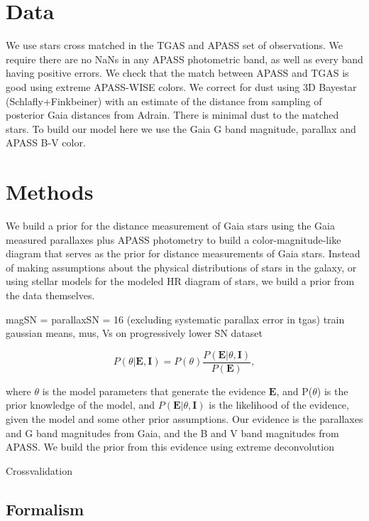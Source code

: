 \documentclass[iop]{emulateapj}
\begin{document}
\section{Data}

We use stars cross matched in the TGAS and APASS set of observations. We require there are no NaNs in any APASS photometric band, as well as every band having positive errors. We check that the match between APASS and TGAS is good using extreme APASS-WISE colors. We correct for dust using 3D Bayestar (Schlafly+Finkbeiner) with an estimate of the distance from sampling of posterior Gaia distances from Adrain. There is minimal dust to the matched stars. To build our model here we use the Gaia G band magnitude, parallax and APASS B-V color. 

\section{Methods}

We build a prior for the distance measurement of Gaia stars using the Gaia measured parallaxes plus APASS photometry to build a color-magnitude-like diagram that serves as the prior for distance measurements of Gaia stars. Instead of making assumptions about the physical distributions of stars in the galaxy, or using stellar models for the modeled HR diagram of stars, we build a prior from the data themselves. 


magSN = parallaxSN = 16 (excluding systematic parallax error in tgas)
train gaussian means, mus, Vs on progressively lower SN dataset 

\begin{equation}
\label{eq:bayes}
P(\theta|\textbf{E}, \textbf{I}) = P(\theta ) \frac{P(\textbf{E} |\theta,\textbf{I})}{P(\textbf{E})},
\end{equation}


where $\theta$ is the model parameters that generate the evidence $\textbf{E}$, and P($\theta$) is the prior knowledge of the model, and $P(\textbf{E} |\theta,\textbf{I})$ is the likelihood of the evidence, given the model and some other prior assumptions. Our evidence is the parallaxes and G band magnitudes from Gaia, and the B and V band magnitudes from APASS. We build the prior from this evidence using extreme deconvolution 


Crossvalidation 

\subsection{Formalism} \label{bozomath}
\end{document}

